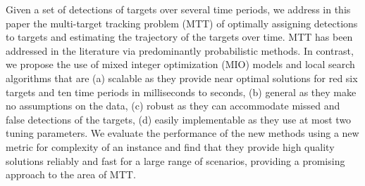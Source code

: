 Given a set of detections of targets over several time periods, we address in this paper the multi-target tracking problem (MTT) of optimally assigning detections to targets and estimating the trajectory of the targets over time. MTT has been addressed in the literature via predominantly probabilistic methods. In contrast, we propose the use of mixed integer optimization (MIO) models and local search algorithms that are (a)  scalable as they provide near optimal solutions for red six targets and ten time periods in milliseconds to seconds, (b) general as they make no assumptions on the data, (c) robust as they can accommodate missed and false detections of the targets, (d) easily implementable as they use at most two tuning parameters. We evaluate the performance of the new methods using a new metric for complexity of an instance and find that they provide high quality solutions reliably and fast for a large range of scenarios, providing a promising approach to the area of MTT. 